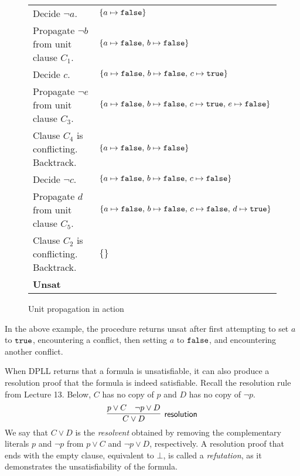 \documentclass[11pt]{article}
\begin{document}
\begin{figure}[h!]
\begin{center}
\begin{tabular}{ll}
Decide $\lnot a$. & $\{a \mapsto \texttt{false} \}$ \\

\quad Propagate $\lnot b$ from unit clause $C_1$. & 
$\{a \mapsto \texttt{false},\, b \mapsto \texttt{false} \}$ \\

\quad Decide $c$. & 
$\{a \mapsto \texttt{false},\, b \mapsto \texttt{false},\, c \mapsto \texttt{true} \}$ \\

\quad \quad \quad Propagate $\lnot e$ from unit clause $C_3$. & 
$\{a \mapsto \texttt{false},\, b \mapsto \texttt{false},\, c \mapsto \texttt{true},\, e \mapsto \texttt{false} \}$ \\

\quad \quad \quad Clause $C_4$ is conflicting. Backtrack. & 
$\{a \mapsto \texttt{false},\, b \mapsto \texttt{false} \}$ \\

\quad Decide $\lnot c$. & 
$\{a \mapsto \texttt{false},\, b \mapsto \texttt{false},\, c \mapsto \texttt{false} \}$ \\

\quad \quad \quad Propagate $d$ from unit clause $C_5$. & 
$\{a \mapsto \texttt{false},\, b \mapsto \texttt{false},\, c \mapsto \texttt{false},\, d \mapsto \texttt{true} \}$ \\

\quad \quad \quad Clause $C_2$ is conflicting. Backtrack. & $\{ \}$ \\

\textbf{Unsat}

\end{tabular}
\end{center}
\caption{Unit propagation in action}\label{fig:sat-ex}
\hrulefill
\end{figure}

\medskip

In the above example, the procedure returns unsat after first attempting to set $a$ to $\texttt{true}$, encountering a conflict, then setting $a$ to $\texttt{false}$, and encountering another conflict.

\noindent
When DPLL returns that a formula is unsatisfiable, it can also produce a resolution proof that the formula is indeed satisfiable.
Recall the resolution rule from Lecture 13. Below, $C$ has no copy of $p$ and $D$ has no copy of $\lnot p$.
\[
  \infer[\m{resolution}]
  {C \lor D}
  {p \lor C & \lnot p \lor D}
\]
We say that $C \lor D$ is the \emph{resolvent} obtained by removing the complementary literals $p$ and $\lnot p$ from $p \lor C$ and $\lnot p \lor D$, respectively.
A resolution proof that ends with the empty clause, equivalent to $\bot$, is called a \emph{refutation}, as it demonstrates the unsatisfiability of the formula.
\end{document}

